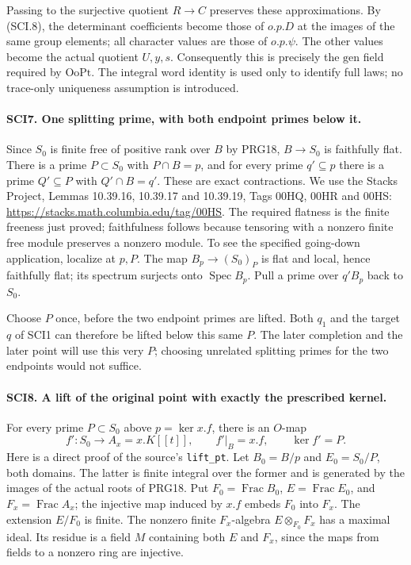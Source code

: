Passing to the surjective quotient \(R\to C\) preserves
these approximations. By (SCI.8), the determinant coefficients
become those of \(o.p.D\) at the images of the same group
elements; all character values are those of \(o.p.\psi\).
The other values become the actual quotient \(U,y,s\).
Consequently this is precisely the \(\mathrm{gen}\) field
required by \(\mathrm{OoPt}\). The integral word identity is
used only to identify full laws; no trace-only uniqueness
assumption is introduced.

\paragraph{SCI7. One splitting prime, with both endpoint primes below it.}
\label{claim:SCI7}
Since \(S_0\) is finite free of positive rank over \(B\)
by PRG18, \(B\to S_0\) is faithfully flat. There is a prime
\(P\subset S_0\) with \(P\cap B=p\), and for every prime
\(q'\subseteq p\) there is a prime \(Q'\subseteq P\)
with \(Q'\cap B=q'\). These are exact contractions.
We use the Stacks Project, Lemmas 10.39.16, 10.39.17 and
10.39.19, Tags 00HQ, 00HR and 00HS:
\url{https://stacks.math.columbia.edu/tag/00HS}.
The required flatness is the finite freeness just proved;
faithfulness follows because tensoring with a nonzero finite
free module preserves a nonzero module. To see the specified
going-down application, localize at \(p,P\). The map
\(B_p\to(S_0)_P\) is flat and local, hence faithfully flat;
its spectrum surjects onto \(\operatorname{Spec}B_p\).
Pull a prime over \(q'B_p\) back to \(S_0\).

Choose \(P\) once, before the two endpoint primes are lifted.
Both \(q_1\) and the target \(q\) of SCI1 can therefore be
lifted below this same \(P\). The later completion and the
later point will use this very \(P\); choosing unrelated
splitting primes for the two endpoints would not suffice.

\paragraph{SCI8. A lift of the original point with exactly the prescribed kernel.}
\label{claim:SCI8}
For every prime \(P\subset S_0\) above \(p=\ker x.f\),
there is an \(O\)-map
\[
 f':S_0\longrightarrow A_x=x.K[[t]],\qquad
 f'|_B=x.f,\qquad\ker f'=P.                               \tag{SCI.10}
\]
Here is a direct proof of the source's \texttt{lift\_pt}.
Let \(B_0=B/p\) and \(E_0=S_0/P\), both domains.
The latter is finite integral over the former and is generated
by the images of the actual roots of PRG18. Put
\(F_0=\operatorname{Frac}B_0\),
\(E=\operatorname{Frac}E_0\), and
\(F_x=\operatorname{Frac}A_x\); the injective map induced by
\(x.f\) embeds \(F_0\) into \(F_x\). The extension
\(E/F_0\) is finite. The nonzero finite \(F_x\)-algebra
\(E\otimes_{F_0}F_x\) has a maximal ideal. Its residue is
a field \(M\) containing both \(E\) and \(F_x\), since
the maps from fields to a nonzero ring are injective.

